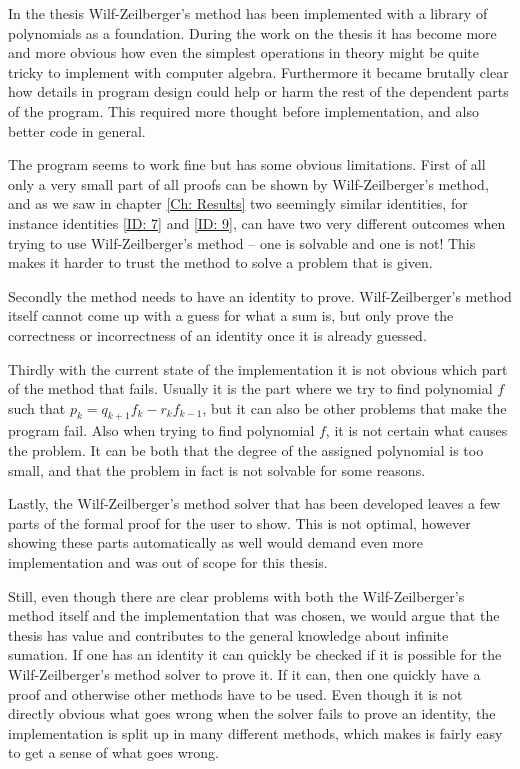 In the thesis Wilf-Zeilberger's method has been implemented with a library of polynomials as a foundation. During the work on the thesis it has become more and more obvious how even the simplest operations in theory might be quite tricky to implement with computer algebra. Furthermore it became brutally clear how details in program design could help or harm the rest of the dependent parts of the program. This required more thought before implementation, and also better code in general.

The program seems to work fine but has some obvious limitations. First of all only a very small part of all proofs can be shown by Wilf-Zeilberger's method, and as we saw in chapter \ref{Ch: Results} two seemingly similar identities, for instance identities \ref{ID: 7} and \ref{ID: 9}, can have two very different outcomes when trying to use Wilf-Zeilberger's method -- one is solvable and one is not! This makes it harder to trust the method to solve a problem that is given.

Secondly the method needs to have an identity to prove. Wilf-Zeilberger's method itself cannot come up with a guess for what a sum is, but only prove the correctness or incorrectness of an identity once it is already guessed.

Thirdly with the current state of the implementation it is not obvious which part of the method that fails. Usually it is the part where we try to find polynomial $f$ such that $p_k=q_{k+1}f_k-r_kf_{k-1}$, but it can also be other problems that make the program fail. Also when trying to find polynomial $f$, it is not certain what causes the problem. It can be both that the degree of the assigned polynomial is too small, and that the problem in fact is not solvable for some reasons.

Lastly, the Wilf-Zeilberger's method solver that has been developed leaves a few parts of the formal proof for the user to show. This is not optimal, however showing these parts automatically as well would demand even more implementation and was out of scope for this thesis.

Still, even though there are clear problems with both the Wilf-Zeilberger's method itself and the implementation that was chosen, we would argue that the thesis has value and contributes to the general knowledge about infinite sumation. If one has an identity it can quickly be checked if it is possible for the Wilf-Zeilberger's method solver to prove it. If it can, then one quickly have a proof and otherwise other methods have to be used. Even though it is not directly obvious what goes wrong when the solver fails to prove an identity, the implementation is split up in many different methods, which makes is fairly easy to get a sense of what goes wrong.

